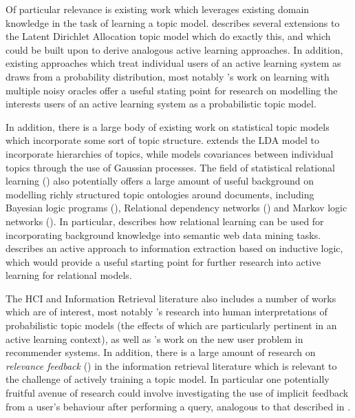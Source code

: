 \documentclass[a4paper, 11pt]{article}
\begin{document}
Of particular relevance is existing work which leverages existing domain knowledge in the task of learning a topic model. \cite{Andrzejewski2010} describes several extensions to the Latent Dirichlet Allocation topic model which do exactly this, and which could be built upon to derive analogous active learning approaches. In addition, existing approaches which treat individual users of an active learning system as draws from a probability distribution, most notably \cite{Sheng2008}'s work on learning with multiple noisy oracles offer a useful stating point for research on modelling the interests users of an active learning system as a probabilistic topic model.

In addition, there is a large body of existing work on statistical topic models which incorporate some sort of topic structure. \cite{Blei2003a} extends the LDA model to incorporate hierarchies of topics, while \cite{Agovic2012} models covariances between individual topics through the use of Gaussian processes. The field of statistical relational learning (\cite{Getoor2007}) also potentially offers a large amount of useful background on modelling richly structured topic ontologies around documents, including Bayesian logic programs (\cite{Brech}), Relational dependency networks (\cite{Neville2007}) and Markov logic networks (\cite{Domingos2007}). In particular, \cite{Fischer2011} describes how relational learning can be used for incorporating background knowledge into semantic web data mining tasks. \cite{Thompson1999} describes an active approach to information extraction based on inductive logic, which would provide a useful starting point for further research into active learning for relational models.

The HCI and Information Retrieval literature also includes a number of works which are of interest, most notably \cite{Chang2009}'s research into human interpretations of probabilistic topic models (the effects of which are particularly pertinent in an active learning context), as well as \cite{Rashid2002}'s work on the new user problem in recommender systems. In addition, there is a large amount of research on \textit{relevance feedback} (\cite{Koenemann1996}) in the information retrieval literature which is relevant to the challenge of actively training a topic model. In particular one potentially fruitful avenue of research could involve investigating the use of implicit feedback from a user's behaviour after performing a query, analogous to that described in \cite{Kelly2001}.
\printbibliography
\end{document}
